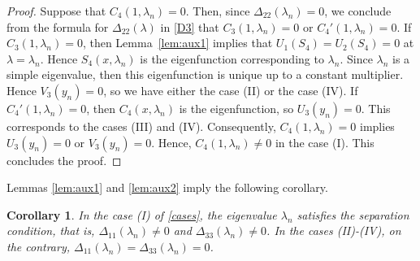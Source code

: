 \documentclass[a4paper,12pt]{article}
\newcommand{\la}{\lambda}
\theoremstyle{plain}
\numberwithin{equation}{section}
\newtheorem{cor}[thm]{Corollary}
\theoremstyle{definition}
\theoremstyle{remark}
\begin{document}
\begin{proof}
Suppose that $C_4(1, \la_n) = 0$. Then, since $\Delta_{22}(\la_n) = 0$, we conclude from the formula for $\Delta_{22}(\la)$ in \eqref{D3} that $C_3(1, \la_n) = 0$ or $C_4'(1, \la_n) = 0$. If $C_3(1, \la_n) = 0$, then Lemma~\ref{lem:aux1} implies that $U_1(S_4) = U_2(S_4) = 0$ at $\la = \la_n$. Hence $S_4(x, \la_n)$ is the eigenfunction corresponding to $\la_n$. Since $\la_n$ is a simple eigenvalue, then this eigenfunction is unique up to a constant multiplier. Hence $V_3(y_n) = 0$, so we have either the case (II) or the case (IV). If $C_4'(1, \la_n) = 0$, then $C_4(x, \la_n)$ is the eigenfunction, so $U_3(y_n) = 0$. This corresponds to the cases (III) and (IV). Consequently, $C_4(1, \la_n) = 0$ implies $U_3(y_n) = 0$ or $V_3(y_n) = 0$. Hence, $C_4(1, \la_n) \ne 0$ in the case (I). This concludes the proof.
\end{proof}

Lemmas \ref{lem:aux1} and \ref{lem:aux2} imply the following corollary.

\begin{cor} \label{cor:sep}
In the case (I) of \eqref{cases}, the eigenvalue $\la_n$ satisfies the separation condition, that is, $\Delta_{11}(\la_n) \ne 0$ and $\Delta_{33}(\la_n) \ne 0$. In the cases (II)-(IV), on the contrary, $\Delta_{11}(\la_n) = \Delta_{33}(\la_n) = 0$.
\end{cor}
\end{document}
